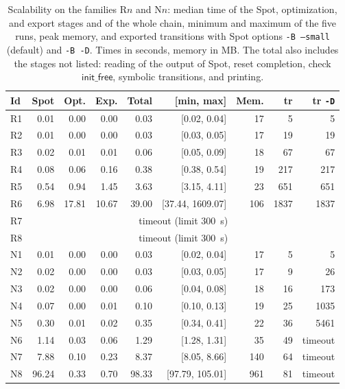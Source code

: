 \begin{table}[t]
\centering
\caption{Scalability on the families R$n$ and N$n$: median time of the Spot, optimization, and export stages and of the whole chain, minimum and maximum of the five runs, peak memory, and exported transitions with Spot options \texttt{-B --small} (default) and \texttt{-B -D}.  Times in seconds, memory in MB.  The total also includes the stages not listed: reading of the output of Spot, reset completion, check $\mathsf{init\_free}$, symbolic transitions, and printing.}
\label{tab:scaling}
\footnotesize
\setlength{\tabcolsep}{3pt}
\begin{tabular}{@{}lrrrrrrrr@{}}
\toprule
Id & Spot & Opt. & Exp. & Total & [min, max] & Mem. & tr & tr \texttt{-D}\\
\midrule
R1 & 0.01 & 0.00 & 0.00 & 0.03 & [0.02, 0.04] & 17 & 5 & 5\\
R2 & 0.01 & 0.00 & 0.00 & 0.03 & [0.03, 0.05] & 17 & 19 & 19\\
R3 & 0.02 & 0.01 & 0.01 & 0.06 & [0.05, 0.09] & 18 & 67 & 67\\
R4 & 0.08 & 0.06 & 0.16 & 0.38 & [0.38, 0.54] & 19 & 217 & 217\\
R5 & 0.54 & 0.94 & 1.45 & 3.63 & [3.15, 4.11] & 23 & 651 & 651\\
R6 & 6.98 & 17.81 & 10.67 & 39.00 & [37.44, 1609.07] & 106 & 1837 & 1837\\
R7 & \multicolumn{8}{c}{timeout (limit 300~s)}\\
R8 & \multicolumn{8}{c}{timeout (limit 300~s)}\\
N1 & 0.01 & 0.00 & 0.00 & 0.03 & [0.02, 0.04] & 17 & 5 & 5\\
N2 & 0.02 & 0.00 & 0.00 & 0.03 & [0.03, 0.05] & 17 & 9 & 26\\
N3 & 0.02 & 0.00 & 0.00 & 0.06 & [0.04, 0.08] & 18 & 16 & 173\\
N4 & 0.07 & 0.00 & 0.01 & 0.10 & [0.10, 0.13] & 19 & 25 & 1035\\
N5 & 0.30 & 0.01 & 0.02 & 0.35 & [0.34, 0.41] & 22 & 36 & 5461\\
N6 & 1.14 & 0.03 & 0.06 & 1.29 & [1.28, 1.31] & 35 & 49 & timeout\\
N7 & 7.88 & 0.10 & 0.23 & 8.37 & [8.05, 8.66] & 140 & 64 & timeout\\
N8 & 96.24 & 0.33 & 0.70 & 98.33 & [97.79, 105.01] & 961 & 81 & timeout\\
\bottomrule
\end{tabular}
\end{table}
